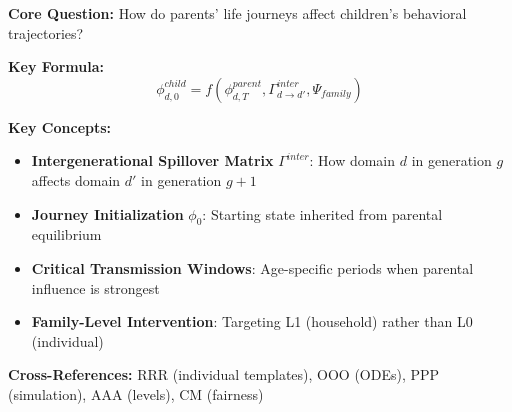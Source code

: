 \begin{tcolorbox}[colback=blue!5!white, colframe=blue!75!black,
    title=Quick Reference: Life Course \& Intergenerational Effects]

\textbf{Core Question:} How do parents' life journeys affect children's behavioral trajectories?

\textbf{Key Formula:}
\begin{equation}
\phi^{child}_{d,0} = f\left(\phi^{parent}_{d,T}, \Gamma^{inter}_{d \to d'}, \Psi_{family}\right)
\end{equation}

\textbf{Key Concepts:}
\begin{itemize}[nosep]
\item \textbf{Intergenerational Spillover Matrix} $\Gamma^{inter}$: How domain $d$ in generation $g$ affects domain $d'$ in generation $g+1$
\item \textbf{Journey Initialization} $\phi_0$: Starting state inherited from parental equilibrium
\item \textbf{Critical Transmission Windows}: Age-specific periods when parental influence is strongest
\item \textbf{Family-Level Intervention}: Targeting L1 (household) rather than L0 (individual)
\end{itemize}

\textbf{Cross-References:} RRR (individual templates), OOO (ODEs), PPP (simulation), AAA (levels), CM (fairness)
\end{tcolorbox}


